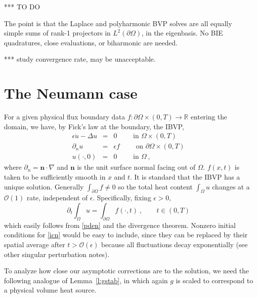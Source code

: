 \documentclass[10pt]{article}
\newcommand{\be}{\begin{equation}}
\newcommand{\ee}{\end{equation}}
\newcommand{\bea}{\begin{eqnarray}}
\newcommand{\eea}{\end{eqnarray}}
\newcommand{\mbf}[1]{{\mathbf #1}}
\newcommand{\R}{\mathbb{R}}
\newcommand{\bigO}{{\mathcal O}}
\newcommand{\pO}{{\partial\Omega}}
\newcommand{\eps}{\epsilon}
\newcommand{\dn}{\partial_n}
\newcommand{\dt}{\partial_t}
\begin{document}
*** TO DO

The point is that the Laplace and polyharmonic BVP solves
are all equally
simple sums of rank-1 projectors in $L^2(\pO)$, in the eigenbasis.
No BIE quadratures, close evaluations, or biharmonic are needed.

*** study convergence rate, may be unacceptable.



\section{The Neumann case}

For a given physical flux boundary data $f: \pO\times(0,T)\to\R$ entering the domain,
we have, by Fick's law at the boundary, the IBVP,
\bea
\eps\dot{u} - \Delta u &=& 0    \qquad \mbox{ in } \Omega\times (0,T)
\label{pden}
\\
\dn u  &=& \eps f  \qquad \mbox{ on } \pO \times (0,T)
\label{bcn}
\\
u(\cdot, 0)    &=&  0 \qquad \mbox{ in } \Omega~,
\label{icn}
\eea
where $\dn = \mbf{n}\cdot\nabla$ and $\mbf{n}$ is the unit surface
normal facing out of $\Omega$.
$f(x,t)$ is taken to be sufficiently smooth in $x$ and $t$.
It is standard that the IBVP has a unique solution.
Generally $\int_\pO f \neq 0$ so the total heat content $\int_\Omega u$
changes at a $\bigO(1)$ rate, independent of $\eps$.
Specifically, fixing $\eps>0$,
\be
\dt \int_\Omega u = \int_\pO f(\cdot,t)~, \qquad t\in(0,T)
\label{cons}
\ee
which easily follows from \eqref{pden} and the divergence theorem.
Nonzero initial conditions for \eqref{icn} would be easy to include,
since they can be replaced by their spatial average after $t>\bigO(\eps)$
because all fluctuations decay exponentially (see other singular perturbation
notes).

To analyze how close our asymptotic corrections are to the solution, we
need the following analogue of Lemma~\ref{l:gstab}, in which again $g$ is scaled to correspond to a physical volume heat source.
\end{document}
